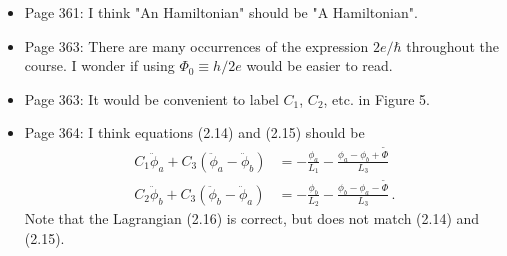 \documentclass{article}
\begin{document}
\begin{itemize}

\item Page 361: I think "An Hamiltonian" should be "A Hamiltonian".

\item Page 363: There are many occurrences of the expression $2e / \hbar$ throughout the course. I wonder if using $\Phi_0 \equiv h / 2e$ would be easier to read.

\item Page 363: It would be convenient to label $C_1$, $C_2$, etc. in Figure 5.

\item Page 364: I think equations (2.14) and (2.15) should be
\begin{align}
C_1 \ddot{\phi}_a + C_3 ( \ddot{\phi}_a - \ddot{\phi}_b) &= - \frac{\phi_a}{L_1} - \frac{\phi_a - \phi_b + \tilde{\Phi}}{L_3} \nonumber \\
C_2 \ddot{\phi}_b + C_3 ( \ddot{\phi}_b - \ddot{\phi}_a) &= - \frac{\phi_b}{L_2} - \frac{\phi_b - \phi_a - \tilde{\Phi}}{L_3} \nonumber \, .
\end{align}
Note that the Lagrangian (2.16) is correct, but does not match (2.14) and (2.15).


\end{itemize}
\end{document}

